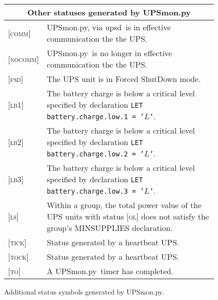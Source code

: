 \documentclass[12pt]{article}
\newcommand{\upsd}{\mbox{\textcolor{UPSDCOLOUR}{upsd}}}
\newcommand{\UPSmon}{\mbox{\textcolor{UPSMONCOLOUR}{UPSmon.py}}}
\newcommand{\LBi}{\textcolor{MONCOLOUR}{\textsc{lb1}}}
\newcommand{\LBii}{\textcolor{MONCOLOUR}{\textsc{lb2}}}
\newcommand{\LBiii}{\textcolor{MONCOLOUR}{\textsc{lb3}}}
\newcommand{\OL}{\textcolor{UPSDCOLOUR}{\textsc{ol}}}
\newcommand{\NOCOMM}{\textcolor{MONCOLOUR}{\textsc{nocomm}}}
\newcommand{\COMM}{\textcolor{UPSMONCOLOUR}{\textsc{comm}}}
\newcommand{\FSD}{\textcolor{UPSMONCOLOUR}{\textsc{fsd}}}
\newcommand{\LS}{\textcolor{UPSMONCOLOUR}{\textsc{ls}}}
\newcommand{\TICK}{\textcolor{UPSMONCOLOUR}{\textsc{tick}}}
\newcommand{\TO}{\textcolor{UPSMONCOLOUR}{\textsc{to}}}
\newcommand{\TOCK}{\textcolor{UPSMONCOLOUR}{\textsc{tock}}}
\newcommand{\status}[1]{\textcolor{UPSDCOLOUR}{[{#1}]}}
\begin{document}
\begin{figure}[ht]
\begin{center}
\begin{tabular}{|l|p{0.9\LinePrinterwidth}|}
\hline
\multicolumn{2}{|c|}{\textbf{Other statuses generated by \UPSmon}} \\ \hline
\status{\COMM}    & \UPSmon, via \upsd\ is in effective communication the the UPS.  \\ \hline
\status{\NOCOMM}  & \UPSmon\ is no longer in effective communication the the UPS.  \\ \hline
\status{\FSD}     & The UPS unit is in Forced ShutDown mode. \\ \hline
\status{\LBi}     & The battery charge is below a critical level specified by declaration
                    \texttt{LET battery.charge.low.1 = '}$L$\texttt{'}. \\ \hline
\status{\LBii}    & The battery charge is below a critical level specified by declaration
                    \texttt{LET battery.charge.low.2 = '}$L$\texttt{'}. \\ \hline
\status{\LBiii}   & The battery charge is below a critical level specified by declaration
                    \texttt{LET battery.charge.low.3 = '}$L$\texttt{'}. \\ \hline
\status{\LS}      & Within a group, the total power value of the UPS units
                    with status \status{\OL} does
                    not satisfy the group's MINSUPPLIES declaration. \\ \hline
\status{\TICK}    & Status generated by a heartbeat UPS. \\ \hline
\status{\TOCK}    & Status generated by a heartbeat UPS. \\ \hline
\status{\TO}      & A \UPSmon\ timer has completed. \\ \hline
\end{tabular}
\caption{Additional status symbols generated by \UPSmon.\label{fig:statussymbolsa}}
\end{center}
\end{figure}
\end{document}
